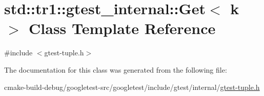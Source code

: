 \hypertarget{classstd_1_1tr1_1_1gtest__internal_1_1Get}{}\section{std\+::tr1\+::gtest\+\_\+internal\+::Get$<$ k $>$ Class Template Reference}
\label{classstd_1_1tr1_1_1gtest__internal_1_1Get}


{\ttfamily \#include $<$gtest-\/tuple.\+h$>$}



The documentation for this class was generated from the following file\+:\begin{DoxyCompactItemize}
\item 
cmake-\/build-\/debug/googletest-\/src/googletest/include/gtest/internal/\mbox{\hyperlink{gtest-tuple_8h}{gtest-\/tuple.\+h}}\end{DoxyCompactItemize}
